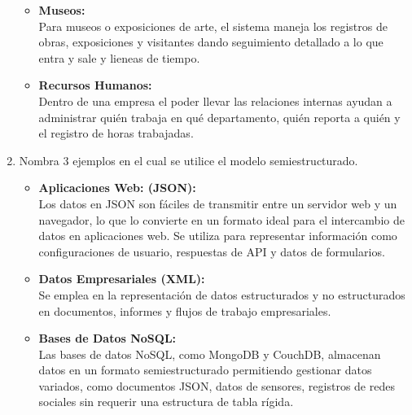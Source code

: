 \documentclass[a4paper,12pt]{article}
\begin{document}
\begin{enumerate}
\begin{itemize}
      \item \textcolor{water}{\textbf{Museos:}}\\
      Para museos o exposiciones de arte, el sistema maneja los registros de obras, exposiciones y visitantes dando seguimiento
       detallado a lo que entra y sale y lieneas de tiempo.

      \item \textcolor{water}{\textbf{Recursos Humanos:}}\\      
      Dentro de una empresa el poder llevar las relaciones internas ayudan a administrar quién trabaja en qué departamento, 
      quién reporta a quién y el registro de horas trabajadas.
      
    \end{itemize}
    \thispagestyle{fancy} %
    \item \textcolor{sun}{Nombra 3 ejemplos en el cual se utilice el modelo semiestructurado.}
    \begin{itemize}
      \item \textcolor{water}{\textbf{Aplicaciones Web: (JSON):}}\\
      Los datos en JSON son fáciles de transmitir entre un servidor web y un navegador, lo que lo convierte en un formato ideal para
       el intercambio de datos en aplicaciones web. Se utiliza para representar información como configuraciones de usuario, 
       respuestas de API y datos de formularios.

      \item \textcolor{water}{\textbf{Datos Empresariales (XML): }}\\
      Se emplea en la representación de datos estructurados y no estructurados en documentos, informes y flujos de trabajo empresariales.       

      \item \textcolor{water}{\textbf{Bases de Datos NoSQL:}}\\
      Las bases de datos NoSQL, como MongoDB y CouchDB, almacenan datos en un formato semiestructurado permitiendo gestionar datos
       variados, como documentos JSON, datos de sensores, registros de redes sociales sin requerir una estructura de tabla rígida.
    \end{itemize}
\end{enumerate}






\end{document}
